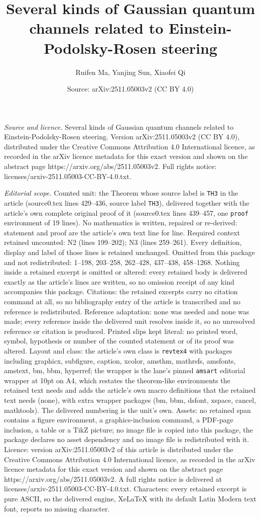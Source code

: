 \documentclass[10pt,a4paper]{amsart}
\title[Several kinds of Gaussian quantum channels related to Einste]{Several kinds of Gaussian quantum channels related to Einstein-Podolsky-Rosen steering}
\author{Ruifen Ma, Yanjing Sun, Xiaofei Qi}
\date{Source: arXiv:2511.05003v2 (CC BY 4.0)}
\begin{document}
\maketitle

\noindent\emph{Source and licence.} Several kinds of Gaussian quantum channels related to Einstein-Podolsky-Rosen steering. Version arXiv:2511.05003v2 (CC BY 4.0), distributed under the Creative Commons Attribution 4.0 International licence, as recorded in the arXiv licence metadata for this exact version and shown on the abstract page https://arxiv.org/abs/2511.05003v2. Full rights notice: licenses/arxiv-2511.05003-CC-BY-4.0.txt.\par\smallskip

\noindent\textit{Editorial scope.} Counted unit: the Theorem whose source label is \texttt{TH3} in the article (source0.tex lines 429--436, source label \texttt{TH3}), delivered together with the article's own complete original proof of it (source0.tex lines 439--457, one \texttt{proof} environment of 19 lines). No mathematics is written, repaired or re-derived: statement and proof are the article's own text line for line. Required context retained uncounted: N2 (lines 199--202); N3 (lines 259--261). Every definition, display and label of those lines is retained unchanged. Omitted from this package and not redistributed: 1--198, 203--258, 262--428, 437--438, 458--1268. Nothing inside a retained excerpt is omitted or altered: every retained body is delivered exactly as the article's lines are written, so no omission receipt of any kind accompanies this package. Citations: the retained excerpts carry no citation command at all, so no bibliography entry of the article is transcribed and no reference is redistributed. Reference adaptation: none was needed and none was made; every reference inside the delivered unit resolves inside it, so no unresolved reference or citation is produced. Printed slips kept literal: no printed word, symbol, hypothesis or number of the counted statement or of its proof was altered. Layout and class: the article's own class is \texttt{revtex4} with packages including graphicx, subfigure, caption, xcolor, amsthm, mathrsfs, amsfonts, amstext, bm, bbm, hyperref; the wrapper is the lane's pinned \texttt{amsart} editorial wrapper at 10pt on A4, which restates the theorem-like environments the retained text needs and adds the article's own macro definitions that the retained text needs (none), with extra wrapper packages (bm, bbm, dsfont, xspace, cancel, mathtools). The delivered numbering is the unit's own. Assets: no retained span contains a figure environment, a graphics-inclusion command, a PDF-page inclusion, a table or a TikZ picture; no image file is copied into this package, the package declares no asset dependency and no image file is redistributed with it. Licence: version arXiv:2511.05003v2 of this article is distributed under the Creative Commons Attribution 4.0 International licence, as recorded in the arXiv licence metadata for this exact version and shown on the abstract page https://arxiv.org/abs/2511.05003v2. A full rights notice is delivered at licenses/arxiv-2511.05003-CC-BY-4.0.txt. Characters: every retained excerpt is pure ASCII, so the delivered engine, XeLaTeX with its default Latin Modern text font, reports no missing character.
\end{document}
